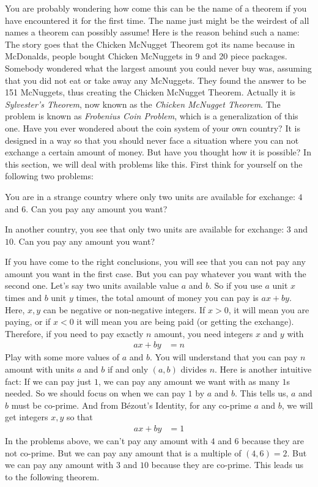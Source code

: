 	You are probably wondering how come this can be the name of a theorem if you have encountered it for the first time. The name just might be the weirdest of all names a theorem can possibly assume! Here is the reason behind such a name: The story goes that the Chicken McNugget Theorem got its name because in McDonalds, people bought Chicken McNuggets in 9 and 20 piece packages. Somebody wondered what the largest amount you could never buy was, assuming that you did not eat or take away any McNuggets. They found the answer to be 151 McNuggets, thus creating the Chicken McNugget Theorem. Actually it is \textit{Sylvester's Theorem}, now known as the \textit{Chicken McNugget Theorem}. The problem is known as \textit{Frobenius Coin Problem}, which is a generalization of this one. Have you ever wondered about the coin system of your own country? It is designed in a way so that you should never face a situation where you can not exchange a certain amount of money. But have you thought how it is possible? In this section, we will deal with problems like this. First think for yourself on the following two problems:
		\begin{problem}
			You are in a strange country where only two units are available for exchange: $4$ and $6$. Can you pay any amount you want?
		\end{problem}

		\begin{problem}
			In another country, you see that only two units are available for exchange: $3$ and $10$. Can you pay any amount you want?
		\end{problem}

	If you have come to the right conclusions, you will see that you can not pay any amount you want in the first case. But you can pay whatever you want with the second one. Let's say two units available value $a$ and $b$. So if you use $a$ unit $x$ times and $b$ unit $y$ times, the total amount of money you can pay is $ax+by$. Here, $x,y$ can be negative or non-negative integers. If $x>0$, it will mean you are paying, or if $x<0$ it will mean you are being paid (or getting the exchange). Therefore, if you need to pay exactly $n$ amount, you need integers $x$ and $y$ with
		\begin{align*}
			ax+by & = n
		\end{align*}
	Play with some more values of $a$ and $b$. You will understand that you can pay $n$ amount with units $a$ and $b$ if and only $(a,b)$ divides $n$. Here is another intuitive fact: If we can pay just $1$, we can pay any amount we want with as many $1$s needed. So we should focus on when we can pay $1$ by $a$ and $b$. This tells us, $a$ and $b$ must be co-prime. And from B\'{e}zout's Identity, for any co-prime $a$ and $b$, we will get integers $x,y$ so that
		\begin{align*}
			ax+by & = 1
		\end{align*}
	In the problems above, we can't pay any amount with $4$ and $6$ because they are not co-prime. But we can pay any amount that is a multiple of $(4,6)=2$. But we can pay any amount with $3$ and $10$ because they are co-prime. This leads us to the following theorem.

